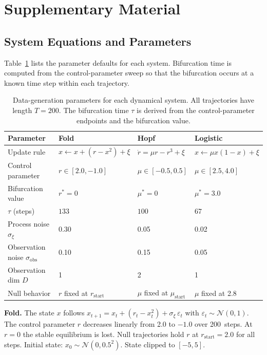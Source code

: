 \section{Supplementary Material}
\label{sec:appendix}

\subsection{System Equations and Parameters}
\label{sec:appendix:systems}

Table~\ref{tab:system_params} lists the parameter defaults for each system.
Bifurcation time is computed from the control-parameter sweep so that the
bifurcation occurs at a known time step within each trajectory.

\begin{table}[htbp]
  \centering
  \caption{Data-generation parameters for each dynamical system. All
  trajectories have length $T = 200$. The bifurcation time $\tau$ is derived
  from the control-parameter endpoints and the bifurcation value.}
  \label{tab:system_params}
  \small
  \begin{tabular}{llll}
    \toprule
    Parameter & Fold & Hopf & Logistic \\
    \midrule
    Update rule
      & $x \leftarrow x + (r - x^2) + \xi$
      & $\dot{r} = \mu r - r^3 + \xi$
      & $x \leftarrow \mu x(1 - x) + \xi$ \\[2pt]
    Control parameter
      & $r \in [2.0, -1.0]$
      & $\mu \in [-0.5, 0.5]$
      & $\mu \in [2.5, 4.0]$ \\[2pt]
    Bifurcation value
      & $r^{*} = 0$
      & $\mu^{*} = 0$
      & $\mu^{*} = 3.0$ \\[2pt]
    $\tau$ (steps)
      & $133$
      & $100$
      & $67$ \\[2pt]
    Process noise $\sigma_{\xi}$
      & 0.30
      & 0.05
      & 0.02 \\[2pt]
    Observation noise $\sigma_{\mathrm{obs}}$
      & 0.10
      & 0.15
      & 0.05 \\[2pt]
    Observation dim $D$
      & 1
      & 2
      & 1 \\[2pt]
    Null behavior
      & $r$ fixed at $r_{\mathrm{start}}$
      & $\mu$ fixed at $\mu_{\mathrm{start}}$
      & $\mu$ fixed at 2.8 \\
    \bottomrule
  \end{tabular}
\end{table}

\textbf{Fold.} The state $x$ follows $x_{t+1} = x_t + (r_t - x_t^2) +
\sigma_\xi\,\varepsilon_t$ with $\varepsilon_t \sim \mathcal{N}(0,1)$. The
control parameter $r$ decreases linearly from 2.0 to $-1.0$ over 200~steps.
At $r = 0$ the stable equilibrium is lost. Null trajectories hold $r$ at
$r_{\mathrm{start}} = 2.0$ for all steps. Initial state:
$x_0 \sim \mathcal{N}(0, 0.5^2)$. State clipped to $[-5, 5]$.

